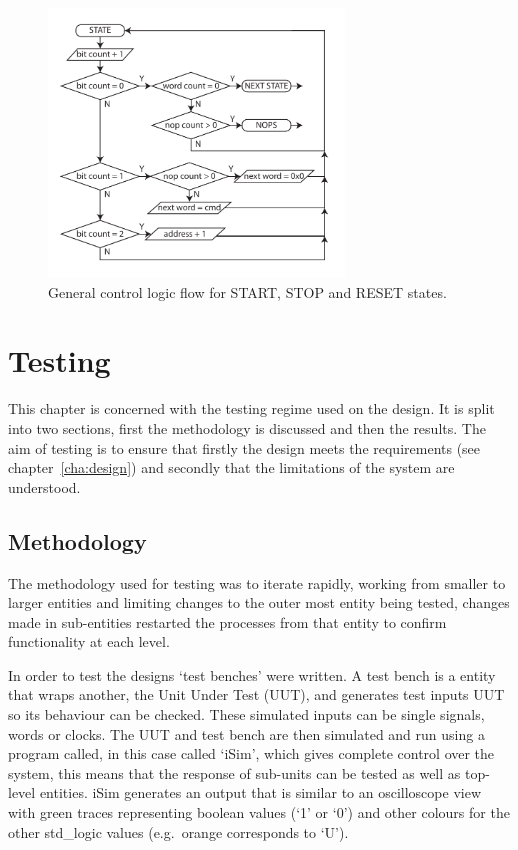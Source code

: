 \begin{figure}[htbp]
  \centering
  \includegraphics[width=0.7\textwidth]{images/pdfs/tx_sm_bram_control_flow.pdf}
  \caption{General control logic flow for START, STOP and RESET states.}
  \label{fig:tx_sm_bram_control_flow}
\end{figure}

\chapter{Testing} %
\label{cha:testing}
This chapter is concerned with the testing regime used on the design. It is split into two sections, first the methodology is discussed and then the results. The aim of testing is to ensure that firstly the design meets the requirements (see chapter~\ref{cha:design}) and secondly that the limitations of the system are understood.
\section{Methodology} %
\label{sec:methodology}
The methodology used for testing was to iterate rapidly, working from smaller to larger entities and limiting changes to the outer most entity being tested, changes made in sub-entities restarted the processes from that entity to confirm functionality at each level. 

In order to test the designs `test benches' were written. A test bench is a entity that wraps another, the Unit Under Test (UUT), and generates test inputs UUT so its behaviour can be checked. These simulated inputs can be single signals, words or clocks. The UUT and test bench are then simulated and run using a program called, in this case called `iSim', which gives complete control over the system, this means that the response of sub-units can be tested as well as top-level entities. iSim generates an output that is similar to an oscilloscope view with green traces representing boolean values (`1' or `0') and other colours for the other std\_logic values (e.g.\ orange corresponds to `U'). 

